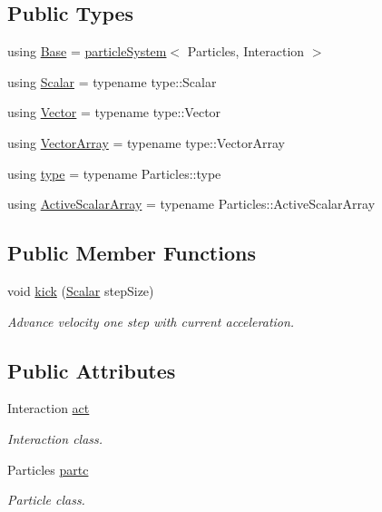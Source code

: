 \subsection*{Public Types}
\begin{DoxyCompactItemize}
\item 
using \mbox{\hyperlink{class_a_rchain_a59c554d5529dc8d1558eb263699bfa24}{Base}} = \mbox{\hyperlink{classparticle_system}{particle\+System}}$<$ Particles, Interaction $>$
\item 
using \mbox{\hyperlink{class_a_rchain_a048c8855064f452c7d6d061531a084ed}{Scalar}} = typename type\+::\+Scalar
\item 
using \mbox{\hyperlink{class_a_rchain_a985f967708536cea258613bcc1147c78}{Vector}} = typename type\+::\+Vector
\item 
using \mbox{\hyperlink{class_a_rchain_a94de7c4b88207f08c7b517736385d9f2}{Vector\+Array}} = typename type\+::\+Vector\+Array
\item 
using \mbox{\hyperlink{class_a_rchain_a7919ed2c8b419f26da20a3bd43ba5fcd}{type}} = typename Particles\+::type
\item 
using \mbox{\hyperlink{class_a_rchain_adeaa416917733980026d138dfde2f7ab}{Active\+Scalar\+Array}} = typename Particles\+::\+Active\+Scalar\+Array
\end{DoxyCompactItemize}
\subsection*{Public Member Functions}
\begin{DoxyCompactItemize}
\item 
void \mbox{\hyperlink{class_a_rchain_a2def151c2de7790ebb1696dddac623e3}{kick}} (\mbox{\hyperlink{class_a_rchain_a048c8855064f452c7d6d061531a084ed}{Scalar}} step\+Size)
\begin{DoxyCompactList}\small\item\em Advance velocity one step with current acceleration. \end{DoxyCompactList}\end{DoxyCompactItemize}
\subsection*{Public Attributes}
\begin{DoxyCompactItemize}
\item 
Interaction \mbox{\hyperlink{class_a_rchain_a41e5c73bc46164302db25b5c5d28aedd}{act}}
\begin{DoxyCompactList}\small\item\em Interaction class. \end{DoxyCompactList}\item 
Particles \mbox{\hyperlink{class_a_rchain_a48cb24fbd9d72503a5e464a02760e814}{partc}}
\begin{DoxyCompactList}\small\item\em Particle class. \end{DoxyCompactList}\end{DoxyCompactItemize}
